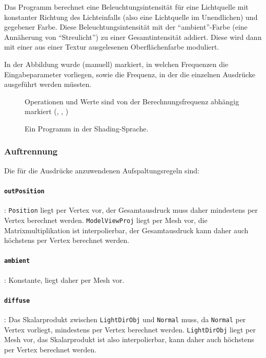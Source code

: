 \documentclass[twoside,a4paper,fleqn,12pt]{book}
\begin{document}
Das Programm berechnet eine Beleuchtungsintensität für eine Lichtquelle mit konstanter Richtung des Lichteinfalls (also eine Lichtquelle im
Unendlichen) und gegebener Farbe. Diese Beleuchtungsintensität mit der ``ambient''-Farbe (eine Annäherung von "`Streulicht"')
zu einer Gesamtintensität addiert. Diese wird dann mit einer aus einer Textur ausgelesenen Oberflächenfarbe moduliert.

In der Abbildung wurde (manuell) markiert, in welchen Frequenzen die Eingabeparameter vorliegen,
sowie die Frequenz, in der die einzelnen Ausdrücke ausgeführt werden müssten.

\begin{figure}[ht]
  
  \caption{Ein Programm in der Shading-Sprache.}
  \centering
  \small Operationen und Werte sind von der Berechnungsfrequenz abhängig markiert (, , )
  \label{fig:simple_s1}
\end{figure}

\subsubsection{Auftrennung}

Die für die Ausdrücke anzuwendenen Aufspaltungsregeln sind:

\paragraph{\texttt{outPosition}}: \texttt{Position} liegt per Vertex vor, der Gesamtausdruck muss daher mindestens per Vertex
berechnet werden. \texttt{ModelViewProj} liegt per Mesh vor, die Matrixmultiplikation ist interpolierbar,
der Gesamtausdruck kann daher auch höchstens per Vertex berechnet werden.

\paragraph{\texttt{ambient}}: Konstante, liegt daher per Mesh vor.

\paragraph{\texttt{diffuse}}: Das Skalarprodukt zwischen \texttt{LightDirObj} und \texttt{Normal} muss, da \texttt{Normal} per Vertex vorliegt,
mindestens per Vertex berechnet werden. \texttt{LightDirObj} liegt per Mesh vor, das Skalarprodukt ist also interpolierbar,
kann daher auch höchstens per Vertex berechnet werden.
\end{document}
